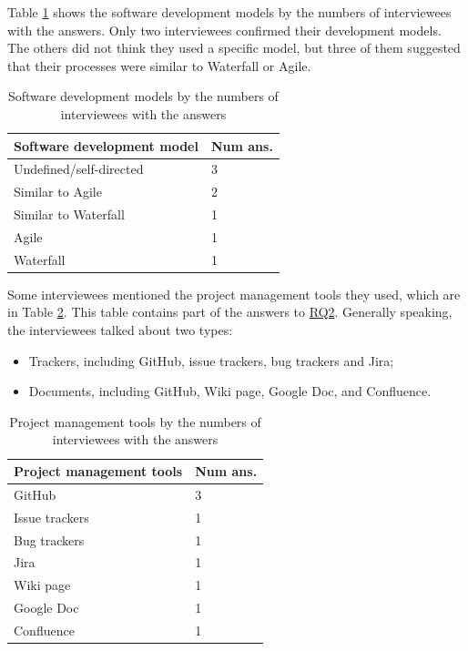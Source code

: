 \documentclass[3p, 12pt,authoryear]{elsarticle}
\begin{document}
Table \ref{tab_developmen_models} shows the software development models by the
numbers of interviewees with the answers. Only two interviewees confirmed their
development models. The others did not think they used a specific model, but
three of them suggested that their processes were similar to Waterfall or Agile.

\begin{table}[ht]
\centering
\begin{tabular}{ll}
\hline
Software development model & Num ans. \\ \hline
Undefined/self-directed & 3 \\
Similar to Agile & 2 \\
Similar to Waterfall & 1 \\
Agile & 1 \\
Waterfall & 1 \\ \hline
\end{tabular}
\caption{\label{tab_developmen_models}Software development models by the numbers
of interviewees with the answers}
\end{table}

Some interviewees mentioned the project management tools they used, which are in
Table \ref{tab_pm_tools}. This table contains part of the answers to
\hyperlink{rq2}{RQ2}. Generally speaking, the interviewees talked about two
types:

\begin{itemize}
\item Trackers, including GitHub, issue trackers, bug trackers and Jira;
\item Documents, including GitHub, Wiki page, Google Doc, and Confluence.
\end{itemize}

\begin{table}[ht]
\centering
\begin{tabular}{ll}
\hline
Project management tools & Num ans. \\ \hline
GitHub & 3 \\
Issue trackers & 1 \\
Bug trackers & 1 \\
Jira & 1 \\
Wiki page & 1 \\
Google Doc & 1 \\
Confluence & 1 \\ \hline
\end{tabular}
\caption{\label{tab_pm_tools}Project management tools by the numbers of
interviewees with the answers}
\end{table}
\end{document}
